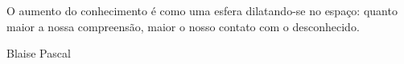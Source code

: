 \begin{dedica}  %

O aumento do conhecimento é como uma esfera dilatando-se no espaço: quanto maior a nossa compreensão, maior o nosso contato com o desconhecido.

Blaise Pascal

\end{dedica}

